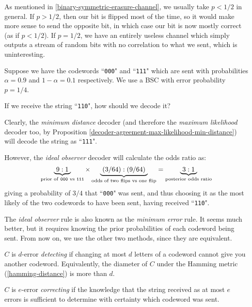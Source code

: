 \documentclass{article}
\begin{document}
\begin{note}
	As mentioned in \ref{binary-symmetric-erasure-channel}, we usually take $p < 1/2$ in general. If $p > 1/2$, then our bit is flipped most of the time, so it would make more sense to send the opposite bit, in which case our bit is now mostly correct (as if $p < 1/2$). If $p = 1/2$, we have an entirely useless channel which simply outputs a stream of random bits with no correlation to what we sent, which is uninteresting.
\end{note}

\begin{example}
    Suppose we have the codewords ``\texttt{000}" and ``\texttt{111}" which are  sent with probabilities $\alpha = 0.9$ and $1-\alpha = 0.1$ respectively. We use a BSC with error probability $p = 1/4$.
    
    If we receive the string ``\texttt{110}", how should we decode it?
    
    Clearly, the \textit{minimum distance} decoder (and therefore the \textit{maximum likelihood} decoder too, by Proposition \ref{decoder-agreement-max-likelihood-min-distance}) will decode the string as ``\texttt{111}".
    
    However, the \textit{ideal observer} decoder will calculate the odds ratio as:
    \[
	\underbrace{\ 9:1 \ }_{\text{prior of \texttt{000} vs \texttt{111}}} \times \underbrace{\ (3/64) : (9/64) \ }_{\text{odds of two flips vs one flip}} = \underbrace{\ 3 : 1 \ }_{\text{posterior odds ratio}}
	\]
	giving a probability of $3/4$ that ``\texttt{000}" was sent, and thus choosing it as the most likely of the two codewords to have been sent, having received ``\texttt{110}".
\end{example}

\begin{note}
	The \textit{ideal observer} rule is also known as the \textit{minimum error} rule. It seems much better, but it requires knowing the prior probabilities of each codeword being sent. From now on, we use the other two methods, since they are equivalent.
\end{note}

\begin{definition}
	\label{error-detecting-correcting}
	$C$ is $d$-error \textit{detecting} if changing at most $d$ letters of a codeword cannot give you another codeword. Equivalently, the diameter of $C$ under the Hamming metric (\ref{hamming-distance}) is more than $d$.
	
	$C$ is $e$-error \textit{correcting} if the knowledge that the string received as at most $e$ errors is sufficient to determine with certainty which codeword was sent.
\end{definition}
\end{document}
